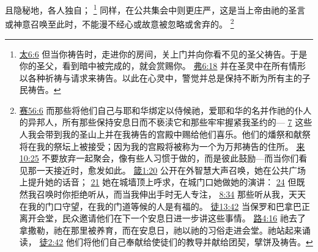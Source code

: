 \documentclass[12pt, a4paper, oneside]{ctexart}
\begin{document}
	且隐秘地，各人独自；
	\footnote {
		\href{https://biblehub.com/matthew/6-6.htm}{太6:6} 但当你祷告时，走进你的房间，关上门并向你看不见的圣父祷告。于是你的圣父，看到暗中被完成的，就会赏赐你。
		\href{https://biblehub.com/ephesians/6-18.htm}{弗6:18} 并在圣灵中在所有情形以各种祈祷与请求来祷告。以此在心灵中，警觉并总是保持不断为所有主的子民祷告。
	}
	同样，在公共集会中则更庄严，这是当上帝由祂的圣言或神意召唤至此时，不能漫不经心或故意被忽略或舍弃的。
	\footnote {
		\href{https://biblehub.com/isaiah/56-6.htm}{赛56:6} 而那些将他们自己与耶和华绑定以侍候祂，爱耶和华的名并作祂的仆人的异邦人，所有那些保持安息日而不亵渎它和那些牢牢握紧我圣约的---
		\href{https://biblehub.com/isaiah/56-7.htm}{7} 这些人我会带到我的圣山上并在我祷告的宫殿中赐给他们喜乐。他们的燔祭和献祭将在我的祭坛上被接受；因为我的宫殿将被称为一个为万邦祷告的住所。
		\href{https://biblehub.com/hebrews/10-25.htm}{来10:25} 不要放弃一起聚会，像有些人习惯于做的，而是彼此鼓励---而当你们看见那一天接近时，愈发如此。
		\href{https://biblehub.com/proverbs/1-20.htm}{箴1:20} 公开在外智慧大声召唤，她在公共广场上提升她的话音；
		\href{https://biblehub.com/proverbs/1-21.htm}{21} 她在城墙顶上呼求，在城门口她做她的演讲：
		\href{https://biblehub.com/proverbs/1-24.htm}{24} 但既然我召唤时你拒绝听从，而当我伸出手时无人专注，
		\href{https://biblehub.com/proverbs/8-34.htm}{8:34} 那些听从我，天天在我的门口守望，在我的门道等候的人是有福的。
		\href{https://biblehub.com/acts/13-42.htm}{徒13:42} 当保罗和巴拿巴正离开会堂，民众邀请他们在下一个安息日进一步讲这些事情。
		\href{https://biblehub.com/luke/4-16.htm}{路4:16} 祂去了拿撒勒，祂在那里被养育，而在安息日，祂以祂的习俗走进会堂。祂站起来诵读，
		\href{https://biblehub.com/acts/2-42.htm}{徒2:42} 他们将他们自己奉献给使徒们的教导并献给团契，擘饼及祷告。
	}
\end{document}
